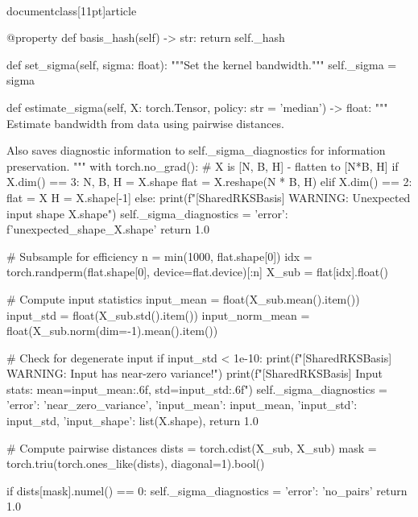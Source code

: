 \\documentclass[11pt]{article}
\begin{document}
\begin{CodeBlock}
    @property
    def basis_hash(self) -> str:
        return self._hash
    
    def set_sigma(self, sigma: float):
        """Set the kernel bandwidth."""
        self._sigma = sigma
    
    def estimate_sigma(self, X: torch.Tensor, policy: str = 'median') -> float:
        """
        Estimate bandwidth from data using pairwise distances.
        
        Also saves diagnostic information to self._sigma_diagnostics for
        information preservation.
        """
        with torch.no_grad():
            # X is [N, B, H] - flatten to [N*B, H]
            if X.dim() == 3:
                N, B, H = X.shape
                flat = X.reshape(N * B, H)
            elif X.dim() == 2:
                flat = X
                H = X.shape[-1]
            else:
                print(f"[SharedRKSBasis] WARNING: Unexpected input shape {X.shape}")
                self._sigma_diagnostics = {'error': f'unexpected_shape_{X.shape}'}
                return 1.0
            
            # Subsample for efficiency
            n = min(1000, flat.shape[0])
            idx = torch.randperm(flat.shape[0], device=flat.device)[:n]
            X_sub = flat[idx].float()
            
            # Compute input statistics
            input_mean = float(X_sub.mean().item())
            input_std = float(X_sub.std().item())
            input_norm_mean = float(X_sub.norm(dim=-1).mean().item())
            
            # Check for degenerate input
            if input_std < 1e-10:
                print(f"[SharedRKSBasis] WARNING: Input has near-zero variance!")
                print(f"[SharedRKSBasis] Input stats: mean={input_mean:.6f}, std={input_std:.6f}")
                self._sigma_diagnostics = {
                    'error': 'near_zero_variance',
                    'input_mean': input_mean,
                    'input_std': input_std,
                    'input_shape': list(X.shape),
                }
                return 1.0
            
            # Compute pairwise distances
            dists = torch.cdist(X_sub, X_sub)
            mask = torch.triu(torch.ones_like(dists), diagonal=1).bool()
            
            if dists[mask].numel() == 0:
                self._sigma_diagnostics = {'error': 'no_pairs'}
                return 1.0
            

\end{CodeBlock}
\end{document}
